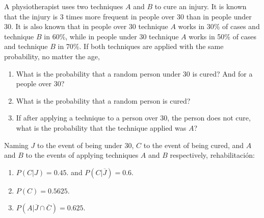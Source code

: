 {A physiotherapist uses two techniques $A$ and $B$ to cure an injury. 
It is known that the injury is 3 times more frequent in people over 30 than in people under 30. 
It is also known that in people over 30 technique $A$ works in 30\% of cases and technique $B$ in 60\%, while in people under 30 technique $A$ works in 50\% of cases and technique $B$ in 70\%. 
If both techniques are applied with the same probability, no matter the age,
\begin{enumerate}
\item What is the probability that a random person under 30 is cured? And for a people over 30?
\item What is the probability that a random person is cured?
\item If after applying a technique to a person over 30, the person does not cure, what is the probability that the technique applied was $A$?
\end{enumerate}
} 
{Naming $J$ to the event of being under 30, $C$ to the event of being cured, and $A$ and $B$ to the events of applying techniques $A$ and $B$ respectively, 
rehabilitación:
\begin{enumerate}
\item $P(C|J)=0.45.$ and $P(C|\overline{J})=0.6$.
\item $P(C)=0.5625$.
\item $P(A|\overline{J}\cap \overline{C})=0.625$.
\end{enumerate}
}
